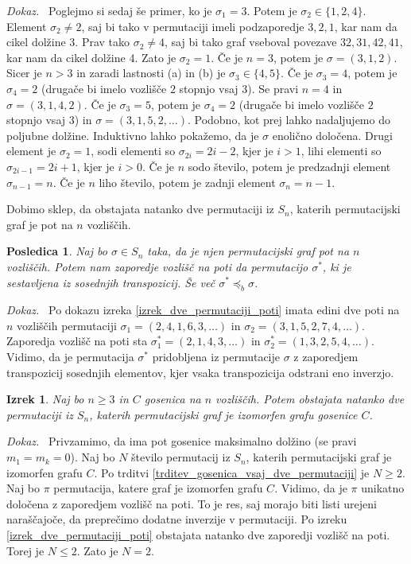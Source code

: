 \documentclass[a4paper, 12pt]{book}
\newtheorem{izrek}{Izrek}[chapter]
\newtheorem{posledica}{Posledica}[chapter]
\newenvironment{dokaz}{\emph{Dokaz.}\ }{\hspace{\fill}{$\Box$}}
\begin{document}
\begin{dokaz}
    Poglejmo si sedaj še primer, ko je $\sigma_1 = 3$. Potem je $\sigma_2 \in \{ 1, 2, 4\}$. Element $\sigma_2 \neq 2$, saj bi tako v permutaciji imeli podzaporedje $3, 2, 1$, kar nam da cikel dolžine 3. Prav tako $\sigma_2 \neq 4$, saj bi tako graf vseboval povezave $32, 31, 42, 41$, kar nam da cikel dolžine 4. Zato je $\sigma_2 = 1$. Če je $n = 3$, potem je $\sigma = (3, 1, 2)$. Sicer je $n > 3$ in zaradi lastnosti (a) in (b) je $\sigma_3 \in \{ 4, 5 \}$. Če je $\sigma_3 = 4$, potem je $\sigma_4 = 2$ (drugače bi imelo vozlišče $2$ stopnjo vsaj $3$). Se pravi $n = 4$ in $\sigma = (3, 1, 4, 2)$. Če je $\sigma_3 = 5$, potem je $\sigma_4 = 2$ (drugače bi imelo vozlišče $2$ stopnjo vsaj $3$) in $\sigma = (3, 1, 5, 2,\dots)$. Podobno, kot prej lahko nadaljujemo do poljubne dolžine. Induktivno lahko pokažemo, da je $\sigma$ enolično določena. Drugi element je $\sigma_2 = 1$, sodi elementi so $\sigma_{2i} = 2i - 2$, kjer je $i > 1$, lihi elementi so $\sigma_{2i - 1} = 2i + 1$, kjer je $i > 0$. Če je $n$ sodo število, potem je predzadnji element $\sigma_{n-1} = n$. Če je $n$ liho število, potem je zadnji element $\sigma_n = n-1$. 

    Dobimo sklep, da obstajata natanko dve permutaciji iz $S_n$, katerih permutacijski graf je pot na $n$ vozliščih.
\end{dokaz}

\begin{posledica}
    Naj bo $\sigma \in S_n$ taka, da je njen permutacijski graf pot na $n$ vozliščih. Potem nam zaporedje vozlišč na poti da permutacijo $\sigma^*$, ki je sestavljena iz sosednjih transpozicij. Še več $\sigma^* \preceq_b \sigma$.
\end{posledica}
\begin{dokaz}
    Po dokazu izreka \ref{izrek_dve_permutaciji_poti} imata edini dve poti na $n$ vozliščih permutaciji $\sigma_1 = (2, 4, 1, 6, 3,\dots)$ in $\sigma_2 = (3, 1, 5, 2, 7, 4,\dots)$. Zaporedja vozlišč na poti sta $\sigma_1^* = (2, 1, 4, 3,\dots)$ in $\sigma_2^* = (1, 3, 2, 5, 4,\dots)$. Vidimo, da je permutacija $\sigma^*$ pridobljena iz permutacije $\sigma$ z zaporedjem transpozicij sosednjih elementov, kjer vsaka transpozicija odstrani eno inverzjo.
\end{dokaz}

\begin{izrek}    
    Naj bo $n \geq 3$ in $C$ gosenica na $n$ vozliščih. Potem obstajata natanko dve permutaciji iz $S_n$, katerih permutacijski graf je izomorfen grafu gosenice $C$.
\end{izrek}
\begin{dokaz}
    Privzamimo, da ima pot gosenice maksimalno dolžino (se pravi $m_1 = m_k = 0$). Naj bo $N$ število permutacij iz $S_n$, katerih permutacijski graf je izomorfen grafu $C$. Po trditvi \ref{trditev_gosenica_vsaj_dve_permutaciji} je $N \geq 2$. Naj bo $\pi$ permutacija, katere graf je izomorfen grafu $C$. Vidimo, da je $\pi$ unikatno določena z zaporedjem vozlišč na poti. To je res, saj morajo biti listi urejeni naraščajoče, da preprečimo dodatne inverzije v permutaciji. Po izreku \ref{izrek_dve_permutaciji_poti} obstajata natanko dve zaporedji vozlišč na poti. Torej je $N \leq 2$. Zato je $N = 2$.
\end{dokaz}
\end{document}
